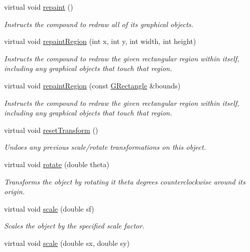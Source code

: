 \begin{DoxyCompactItemize}
virtual void \mbox{\hyperlink{classGCompound_ac827b978aa122f136a14c198687ad80f}{repaint}} ()
\begin{DoxyCompactList}\small\item\em Instructs the compound to redraw all of its graphical objects. \end{DoxyCompactList}\item 
virtual void \mbox{\hyperlink{classGCompound_a4a919e3851ebfbf0f161a66cc15d4531}{repaint\+Region}} (int x, int y, int width, int height)
\begin{DoxyCompactList}\small\item\em Instructs the compound to redraw the given rectangular region within itself, including any graphical objects that touch that region. \end{DoxyCompactList}\item 
virtual void \mbox{\hyperlink{classGCompound_a769c46fb3e1004aec76e8b0adfa42aa6}{repaint\+Region}} (const \mbox{\hyperlink{classGRectangle}{G\+Rectangle}} \&bounds)
\begin{DoxyCompactList}\small\item\em Instructs the compound to redraw the given rectangular region within itself, including any graphical objects that touch that region. \end{DoxyCompactList}\item 
virtual void \mbox{\hyperlink{classGObject_a6022a1fd1e5dcd2fd5585e5a36aa3f37}{reset\+Transform}} ()
\begin{DoxyCompactList}\small\item\em Undoes any previous scale/rotate transformations on this object. \end{DoxyCompactList}\item 
virtual void \mbox{\hyperlink{classGObject_ae1ffaa12185dfd5ba464f7d87c329e26}{rotate}} (double theta)
\begin{DoxyCompactList}\small\item\em Transforms the object by rotating it {\ttfamily theta} degrees counterclockwise around its origin. \end{DoxyCompactList}\item 
virtual void \mbox{\hyperlink{classGObject_ad2e1900f730475c2d044817db03b38d6}{scale}} (double sf)
\begin{DoxyCompactList}\small\item\em Scales the object by the specified scale factor. \end{DoxyCompactList}\item 
virtual void \mbox{\hyperlink{classGObject_a63641f69d610d0b951357d35a0c3b1e3}{scale}} (double sx, double sy)

\end{DoxyCompactItemize}
